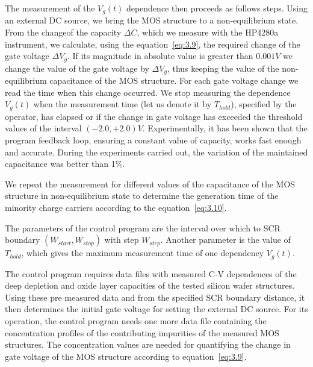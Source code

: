 The measurement of the $V_{g}(t)$ dependence then proceeds as follows
steps. Using an external DC source, we bring the MOS structure to a
non-equilibrium state. From the changeof the capacity ${\Delta{C}}$,
which we measure with the HP4280a instrument, we calculate, using the
equation~\ref{eq:3.9}, the required change of the gate voltage
$\Delta{V_{g}}$. If its magnitude in absolute value is greater than
$0.001 V$ we change the value of the gate voltage by $\Delta{V_{g}}$,
thus keeping the value of the non-equilibrium capacitance of the MOS
structure. For each gate voltage change we read the time when this
change occurred. We stop measuring the dependence $V_{g}(t)$ when the
measurement time (let us denote it by $T_{hold}$), specified by the
operator, has elapsed or if the change in gate voltage has exceeded
the threshold values of the interval $(-2.0,+2.0) V$.  Experimentally,
it has been shown that the program feedback loop, ensuring a constant
value of capacity, works fast enough and accurate. During the
experiments carried out, the variation of the maintained capacitance
was better than 1\%.

We repeat the measurement for different values of the capacitance of
the MOS structure in non-equilibrium state to determine the generation
time of the minority charge carriers according to the
equation~\ref{eq:3.10}.

The parameters of the control program are the interval over which to
SCR boundary $(W_{start}, W_{stop})$ with step $W_{step}$. Another
parameter is the value of $T_{hold}$, which gives the maximum
measurement time of one dependency $V_{g}(t)$.

The control program requires data files with measured C-V dependences
of the deep depletion and oxide layer capacities of the tested silicon
wafer structures. Using these pre measured data and from the specified
SCR boundary distance, it then determines the initial gate voltage for
setting the external DC source.  For its operation, the control
program needs one more data file containing the concentration profiles
of the contributing impurities of the measured MOS structures. The
concentration values are needed for quantifying the change in gate
voltage of the MOS structure according to equation~\ref{eq:3.9}.

